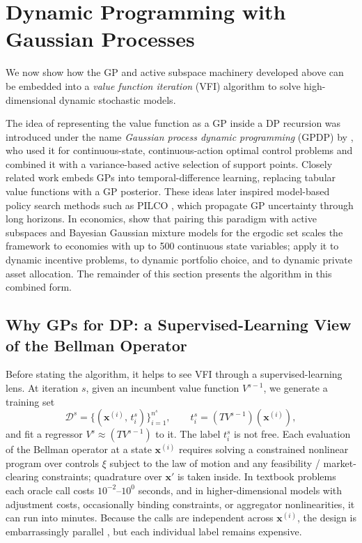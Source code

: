 \documentclass[11pt,a4paper]{report}
\newcommand{\x}{\bm{x}}
\begin{document}

\section{Dynamic Programming with Gaussian Processes}
\label{sec:gp_dp}

We now show how the GP and active subspace machinery developed above can be embedded into a \emph{value function iteration} (VFI) algorithm to solve high-dimensional dynamic stochastic models.

The idea of representing the value function as a GP inside a DP recursion was introduced under the name \emph{Gaussian process dynamic programming} (GPDP) by \citet{deisenroth2009gaussian}, who used it for continuous-state, continuous-action optimal control problems and combined it with a variance-based active selection of support points.  Closely related work \citep{engel2005reinforcement} embeds GPs into temporal-difference learning, replacing tabular value functions with a GP posterior.  These ideas later inspired model-based policy search methods such as PILCO \citep{deisenroth2011pilco}, which propagate GP uncertainty through long horizons.  In economics, \citet{SCHEIDEGGER201968} show that pairing this paradigm with active subspaces and Bayesian Gaussian mixture models for the ergodic set scales the framework to economies with up to 500 continuous state variables; \citet{rennerscheidegger_2018} apply it to dynamic incentive problems, \citet{gaegauf2023portfolio} to dynamic portfolio choice, and \citet{chen2025private} to dynamic private asset allocation.  The remainder of this section presents the algorithm in this combined form.

\subsection{Why GPs for DP: a Supervised-Learning View of the Bellman Operator}
\label{sec:gp_dp_supervised_view}

Before stating the algorithm, it helps to see VFI through a supervised-learning lens.  At iteration $s$, given an incumbent value function $V^{s-1}$, we generate a training set
\[
\mathcal{D}^s = \bigl\{(\x^{(i)},\, t_i^s)\bigr\}_{i=1}^{n^s}, \qquad t_i^s = (TV^{s-1})(\x^{(i)}),
\]
and fit a regressor $V^s \approx (TV^{s-1})$ to it.  The label $t_i^s$ is not free.  Each evaluation of the Bellman operator at a state $\x^{(i)}$ requires solving a constrained nonlinear program over controls $\xi$ subject to the law of motion and any feasibility / market-clearing constraints; quadrature over $\x'$ is taken inside.  In textbook problems each oracle call costs $10^{-2}$--$10^{0}$ seconds, and in higher-dimensional models with adjustment costs, occasionally binding constraints, or aggregator nonlinearities, it can run into minutes.  Because the calls are independent across $\x^{(i)}$, the design is embarrassingly parallel \citep{SCHEIDEGGER201968}, but each individual label remains expensive.
\end{document}
